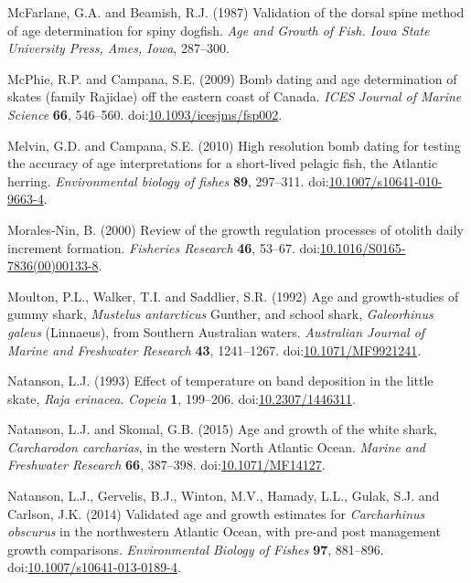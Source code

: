 \documentclass[]{article}
\begin{document}
\hypertarget{ref-mcfarlane_validation_1987}{}
McFarlane, G.A. and Beamish, R.J. (1987) Validation of the dorsal spine
method of age determination for spiny dogfish. \emph{Age and Growth of
Fish. Iowa State University Press, Ames, Iowa}, 287--300.

\hypertarget{ref-mcphie_bomb_2009}{}
McPhie, R.P. and Campana, S.E. (2009) Bomb dating and age determination
of skates (family Rajidae) off the eastern coast of Canada. \emph{ICES
Journal of Marine Science} \textbf{66}, 546--560.
doi:\href{https://doi.org/10.1093/icesjms/fsp002}{10.1093/icesjms/fsp002}.

\hypertarget{ref-melvin_high_2010}{}
Melvin, G.D. and Campana, S.E. (2010) High resolution bomb dating for
testing the accuracy of age interpretations for a short-lived pelagic
fish, the Atlantic herring. \emph{Environmental biology of fishes}
\textbf{89}, 297--311.
doi:\href{https://doi.org/10.1007/s10641-010-9663-4}{10.1007/s10641-010-9663-4}.

\hypertarget{ref-morales-nin_review_2000}{}
Morales-Nin, B. (2000) Review of the growth regulation processes of
otolith daily increment formation. \emph{Fisheries Research}
\textbf{46}, 53--67.
doi:\href{https://doi.org/10.1016/S0165-7836(00)00133-8}{10.1016/S0165-7836(00)00133-8}.

\hypertarget{ref-moulton_age_1992}{}
Moulton, P.L., Walker, T.I. and Saddlier, S.R. (1992) Age and
growth-studies of gummy shark, \emph{Mustelus antarcticus} Gunther, and
school shark, \emph{Galeorhinus galeus} (Linnaeus), from Southern
Australian waters. \emph{Australian Journal of Marine and Freshwater
Research} \textbf{43}, 1241--1267.
doi:\href{https://doi.org/10.1071/MF9921241}{10.1071/MF9921241}.

\hypertarget{ref-natanson_effect_1993}{}
Natanson, L.J. (1993) Effect of temperature on band deposition in the
little skate, \emph{Raja erinacea}. \emph{Copeia} \textbf{1}, 199--206.
doi:\href{https://doi.org/10.2307/1446311}{10.2307/1446311}.

\hypertarget{ref-natanson_age_2015}{}
Natanson, L.J. and Skomal, G.B. (2015) Age and growth of the white
shark, \emph{Carcharodon carcharias}, in the western North Atlantic
Ocean. \emph{Marine and Freshwater Research} \textbf{66}, 387--398.
doi:\href{https://doi.org/10.1071/MF14127}{10.1071/MF14127}.

\hypertarget{ref-natanson_validated_2014}{}
Natanson, L.J., Gervelis, B.J., Winton, M.V., Hamady, L.L., Gulak, S.J.
and Carlson, J.K. (2014) Validated age and growth estimates for
\emph{Carcharhinus obscurus} in the northwestern Atlantic Ocean, with
pre-and post management growth comparisons. \emph{Environmental Biology
of Fishes} \textbf{97}, 881--896.
doi:\href{https://doi.org/10.1007/s10641-013-0189-4}{10.1007/s10641-013-0189-4}.
\end{document}
